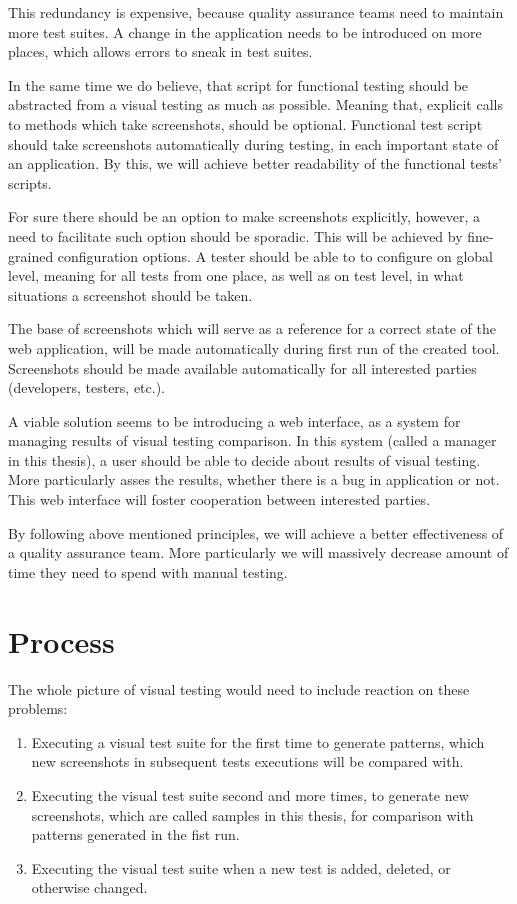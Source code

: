 \documentclass[11pt,oneside,final]{fithesis2}
\begin{document}
  This redundancy is expensive, because quality assurance teams need to maintain more test suites. A change in the application needs to be introduced on more places, which allows errors to
  sneak in test suites.
  
  In the same time we do believe, that script for functional testing should be abstracted from a visual testing as much as possible. Meaning that, explicit calls to methods which 
  take screenshots, should be optional. Functional test script should take screenshots automatically during testing, in each important state of an application. By this, we will achieve better
  readability of the functional tests' scripts.
  
  For sure there should be an option to make screenshots explicitly, however, a need to facilitate such option should be sporadic. This will be achieved by fine-grained configuration options.
  A tester should be able to to configure on global level, meaning for all tests from one place, as well as on test level, in what situations a screenshot should be taken.
  
  The base of screenshots which will serve as a reference for a correct state of the web application, will be made automatically during first run of the created tool. 
  Screenshots should be made available automatically for all interested parties (developers, testers, etc.).
  
  A viable solution seems to be introducing a web interface, as a system for managing results of visual testing comparison. In this system (called a manager in this thesis), a user should be
  able to decide about results of visual testing. More particularly asses the results, whether there is a bug in application or not. 
  This web interface will foster cooperation between interested parties.
  
  By following above mentioned principles, we will achieve a better effectiveness of a quality assurance team. More particularly we will massively decrease amount of time they need to spend 
  with manual testing.
  
  \section{Process}
  The whole picture of visual testing would need to include reaction on these problems:
  \begin{enumerate}
   \item Executing a visual test suite for the first time to generate patterns, which new screenshots in subsequent tests executions will be compared with.
   \item Executing the visual test suite second and more times, to generate new screenshots, which are called samples in this thesis, for comparison with patterns generated in the fist run.
   \item Executing the visual test suite when a new test is added, deleted, or otherwise changed.
  \end{enumerate}
\end{document}
